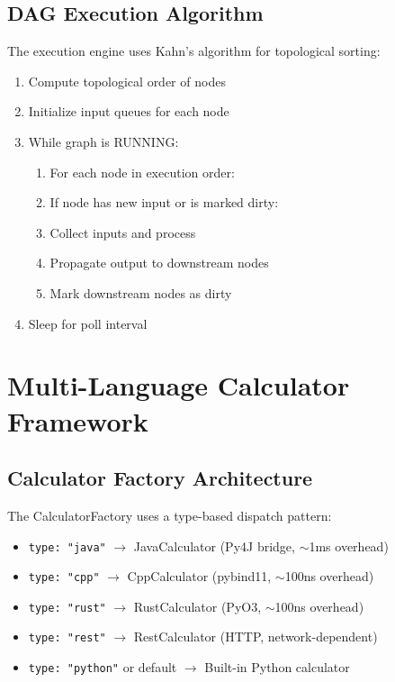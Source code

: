 \documentclass[11pt,a4paper]{article}
\begin{document}
\subsection{DAG Execution Algorithm}

The execution engine uses Kahn's algorithm for topological sorting:

\begin{enumerate}
    \item Compute topological order of nodes
    \item Initialize input queues for each node
    \item While graph is RUNNING:
    \begin{enumerate}
        \item For each node in execution order:
        \item If node has new input or is marked dirty:
        \item Collect inputs and process
        \item Propagate output to downstream nodes
        \item Mark downstream nodes as dirty
    \end{enumerate}
    \item Sleep for poll interval
\end{enumerate}

\section{Multi-Language Calculator Framework}

\subsection{Calculator Factory Architecture}

The CalculatorFactory uses a type-based dispatch pattern:

\begin{itemize}
    \item \texttt{type: "java"} $\rightarrow$ JavaCalculator (Py4J bridge, $\sim$1ms overhead)
    \item \texttt{type: "cpp"} $\rightarrow$ CppCalculator (pybind11, $\sim$100ns overhead)
    \item \texttt{type: "rust"} $\rightarrow$ RustCalculator (PyO3, $\sim$100ns overhead)
    \item \texttt{type: "rest"} $\rightarrow$ RestCalculator (HTTP, network-dependent)
    \item \texttt{type: "python"} or default $\rightarrow$ Built-in Python calculator
\end{itemize}
\end{document}
